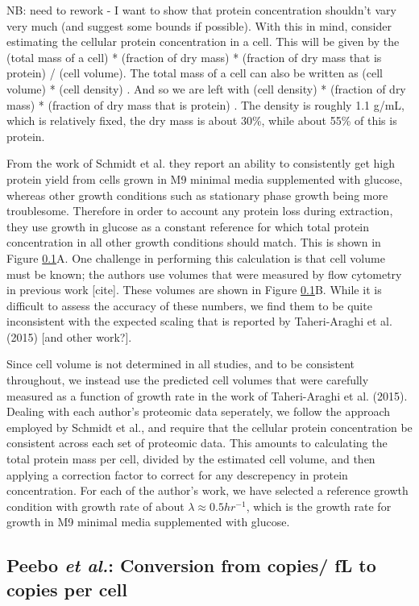 \documentclass[11pt]{article}
\begin{document}
NB: need to rework - I want to show that protein concentration shouldn't vary very much (and suggest some
bounds if possible).
With this in mind, consider estimating the cellular protein
concentration in a cell. This will be given by the (total mass of a cell) *
(fraction of dry mass) * (fraction  of dry mass that is protein) / (cell
volume). The total mass of a cell can also be written as (cell volume) * (cell
density) . And so we are  left with (cell density) * (fraction of dry mass) *
(fraction  of dry mass that is protein) . The density is roughly 1.1 g/mL, which
is relatively fixed, the dry  mass is about 30\%,  while about 55\% of this  is
protein.


From the work of Schmidt et al. they report an ability to consistently get high
protein yield from cells grown in M9 minimal media supplemented with glucose,
whereas other growth  conditions such as stationary  phase growth being more
troublesome. Therefore in  order to account any protein loss during extraction,
they use growth in glucose as a
constant reference for which total protein concentration in all other growth
conditions should match. This is shown in Figure \ref{}A. One challenge in
performing this calculation is that cell volume must be known; the authors use
volumes that were  measured by flow cytometry in previous work [cite]. These
volumes are shown in Figure \ref{}B. While it is difficult to assess the
accuracy of these numbers, we find them to be quite inconsistent with the
expected scaling that is reported by Taheri-Araghi et al. (2015) [and other work?].

Since cell volume is not determined in all studies, and to be  consistent
throughout, we instead use the predicted cell volumes that were carefully
measured as a function of growth rate in the work of Taheri-Araghi et al.
(2015). Dealing with each author's  proteomic data seperately, we follow the
approach employed by Schmidt et al., and require that the cellular protein
concentration be consistent across each set of proteomic data. This  amounts to
calculating the total protein mass per cell, divided by the estimated cell
volume,  and then applying a correction factor to correct for any descrepency in
protein concentration.  For each of the author's work, we have selected a
reference growth condition with growth rate of about $\lambda \approx 0.5
hr^{-1}$, which is the growth rate for growth in M9 minimal media supplemented
with glucose.


\subsection{Peebo {\it et al.}: Conversion from copies/ fL to copies per cell}
\end{document}
